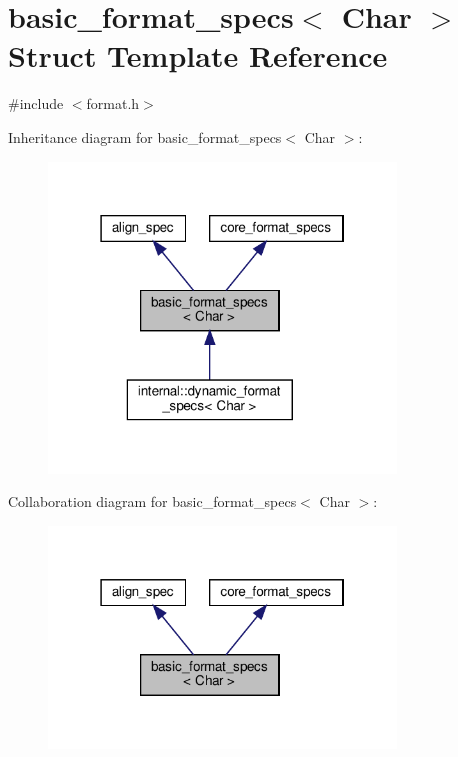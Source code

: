 \hypertarget{structbasic__format__specs}{}\section{basic\+\_\+format\+\_\+specs$<$ Char $>$ Struct Template Reference}
\label{structbasic__format__specs}


{\ttfamily \#include $<$format.\+h$>$}



Inheritance diagram for basic\+\_\+format\+\_\+specs$<$ Char $>$\+:
\nopagebreak
\begin{figure}[H]
\begin{center}
\leavevmode
\includegraphics[width=262pt]{structbasic__format__specs__inherit__graph}
\end{center}
\end{figure}


Collaboration diagram for basic\+\_\+format\+\_\+specs$<$ Char $>$\+:
\nopagebreak
\begin{figure}[H]
\begin{center}
\leavevmode
\includegraphics[width=262pt]{structbasic__format__specs__coll__graph}
\end{center}
\end{figure}
